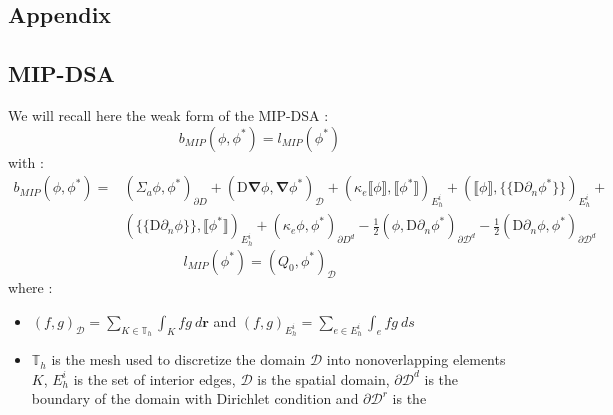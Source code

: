 \documentclass[preprint,10pt]{elsarticle}
\newcommand\bn{\boldsymbol{\nabla}}
\newcommand\br{\mathbf{r}}
\newcommand\ldb{\{\!\!\{}
\newcommand\rdb{\}\!\!\}}
\newcommand\llb{\llbracket}
\newcommand\rrb{\rrbracket}
\renewcommand{\(}{\left(}
\renewcommand{\)}{\right)}
\renewcommand{\[}{\left[}
\renewcommand{\]}{\right]}
\begin{document}




\begin{appendices}
\section{Appendix}
\subsection{MIP-DSA}
We will recall here the weak form of the MIP-DSA \cite{mip} :
\begin{equation}
b_{MIP}(\phi,\phi^*) = l_{MIP}(\phi^*)
\end{equation}
with :
\begin{equation}
\begin{split}
b_{MIP}(\phi,\phi^*) =& (\Sigma_a \phi,\phi^*)_{\partial D} +
\(\mathrm{D}\bn\phi,\bn\phi^*\)_{\mathcal{D}} + \(\kappa_e\llb\phi\rrb,
\llb\phi^*\rrb\)_{E_h^i}
+ \(\llb\phi\rrb,\ldb \mathrm{D}\partial_n \phi^*\rdb\)_{E_h^i} +\\
&(\ldb \mathrm{D} \partial_n \phi\rdb,\llb\phi^*\rrb)_{E_h^i} + 
(\kappa_e\phi,\phi^*)_{\partial
D^d}-\frac{1}{2} \(\phi,\mathrm{D}\partial_n \phi^*\)_{\partial
\mathcal{D}^d} - \frac{1}{2} (\mathrm{D} \partial_n \phi,\phi^*)_{\partial 
\mathcal{D}^d}
\end{split}
\end{equation}
\begin{equation}
l_{MIP}(\phi^*) = (Q_0,\phi^*)_{\mathcal{D}} 
\end{equation}
where :
\begin{itemize}
\item $(f,g)_{\mathcal{D}} = \sum_{K\in \mathbb{T}_h} \int_K fg\ d\br$ and 
$(f,g)_{E_h^i} = \sum_{e\in E_h^i} \int_e fg\ ds$
\item $\mathbb{T}_h$ is the mesh used to discretize the domain $\mathcal{D}$
into nonoverlapping elements $K$, $E_h^i$ is the set of interior edges,
$\mathcal{D}$ is the spatial domain, $\partial \mathcal{D}^d$ is the boundary
of the domain with Dirichlet condition and $\partial \mathcal{D}^r$ is the

\end{itemize}
\end{appendices}
\end{document}
